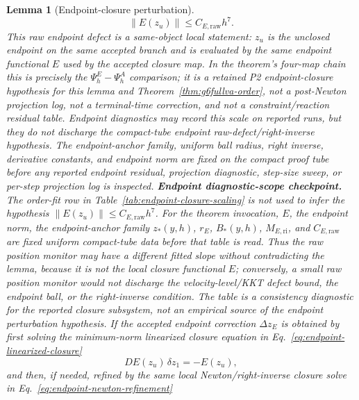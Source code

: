\documentclass[preprint,12pt]{elsarticle}
\newtheorem{lemma}{Lemma}
\begin{document}
\begin{lemma}[Endpoint-closure perturbation]
\begin{equation}
\label{eq:endpoint-raw-defect-bound}
  \|E(z_u)\|\le C_{E,\mathrm{raw}}h^7 .
\end{equation}
This raw endpoint defect is a same-object local statement: \(z_u\) is the
unclosed endpoint on the same accepted branch and is evaluated by the same
endpoint functional \(E\) used by the accepted closure map. In the theorem's
four-map chain this is precisely the \(\Psi_h^E-\Psi_h^A\) comparison; it is
a retained P2 endpoint-closure hypothesis for this lemma and
Theorem~\ref{thm:g6fullva-order}, not a post-Newton projection log, not a
terminal-time correction, and not a constraint/reaction residual table.
Endpoint diagnostics may record this scale on reported runs, but they do not
discharge the compact-tube endpoint raw-defect/right-inverse hypothesis.
The endpoint-anchor family, uniform ball radius, right inverse, derivative
constants, and endpoint norm are fixed on the compact proof tube before any reported
endpoint residual, projection diagnostic, step-size sweep, or per-step
projection log is inspected.
\noindent\textbf{Endpoint diagnostic-scope checkpoint.}
The order-fit row in Table~\ref{tab:endpoint-closure-scaling} is not used to
infer the hypothesis \(\|E(z_u)\|\le C_{E,\mathrm{raw}}h^7\).  For the
theorem invocation, \(E\), the endpoint norm, the endpoint-anchor family
\(z_\ast(y,h)\), \(r_E\), \(B_\ast(y,h)\), \(M_{E,\mathrm{ri}}\), and
\(C_{E,\mathrm{raw}}\) are fixed uniform compact-tube data before that table
is read.  Thus the raw position monitor
may have a different fitted slope without contradicting the lemma, because it
is not the local closure functional \(E\); conversely, a small raw position
monitor would not discharge the velocity-level/KKT defect bound, the endpoint
ball, or the right-inverse condition.  The table is a consistency diagnostic
for the reported closure subsystem, not an empirical source of the endpoint
perturbation hypothesis.
If the accepted endpoint correction $\Delta z_E$ is obtained by first solving
the minimum-norm linearized closure equation in
Eq.~\eqref{eq:endpoint-linearized-closure}
\begin{equation}
\label{eq:endpoint-linearized-closure}
  D E(z_u)\,\delta z_1=-E(z_u),
\end{equation}
and then, if needed, refined by the same local Newton/right-inverse closure
solve in Eq.~\eqref{eq:endpoint-newton-refinement}
\begin{equation}
\label{eq:endpoint-newton-refinement}
  \begin{aligned}

\end{aligned}
\end{equation}
\end{lemma}
\end{document}
